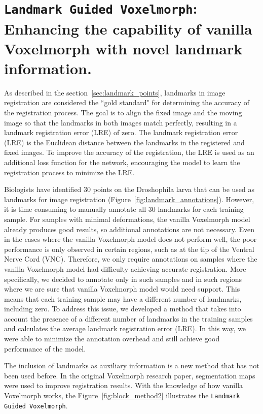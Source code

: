 \documentclass{book}
\begin{document}
	\section{\texttt{Landmark Guided Voxelmorph}: Enhancing the capability of vanilla Voxelmorph with novel landmark information.}
	As described in the section~\ref{sec:landmark_points}, landmarks in image registration are considered the ``gold standard" for determining the accuracy of the registration process. The goal is to align the fixed image and the moving image so that the landmarks in both images match perfectly, resulting in a landmark registration error (LRE) of zero. The landmark registration error (LRE) is the Euclidean distance between the landmarks in the registered and fixed images. To improve the accuracy of the registration, the LRE is used as an additional loss function for the network, encouraging the model to learn the registration process to minimize the LRE.
	
	Biologists have identified 30 points on the Droshophila larva that can be used as landmarks for image registration (Figure~\ref{fig:landmark_annotations}). However, it is time consuming to manually annotate all 30 landmarks for each training sample. For samples with minimal deformations, the vanilla Voxelmorph model already produces good results, so additional annotations are not necessary. Even in the cases where the vanilla Voxelmorph model does not perform well, the poor performance is only observed in certain regions, such as at the tip of the Ventral Nerve Cord (VNC). Therefore, we only require annotations on samples where the vanilla Voxelmorph model had difficulty achieving accurate registration. More specifically, we decided to annotate only in such samples and in such regions where we are sure that vanilla Voxelmorph model would need support. This means that each training sample may have a different number of landmarks, including zero. To address this issue, we developed a method that takes into account the presence of a different number of landmarks in the training samples and calculates the average landmark registration error (LRE). In this way, we were able to minimize the annotation overhead and still achieve good performance of the model.
	
	The inclusion of landmarks as auxiliary information is a new method that has not been used before. In the original Voxelmorph research paper, segmentation maps were used to improve registration results. With the knowledge of how vanilla Voxelmorph works, the Figure~\ref{fig:block_method2} illustrates the \texttt{Landmark Guided Voxelmorph}.
	
\end{document}
